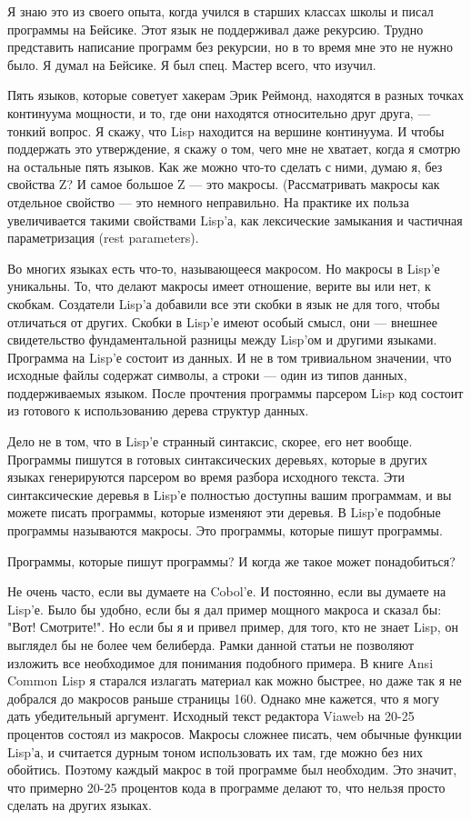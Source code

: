 \documentclass[ebook,12pt,oneside,openany]{memoir}
\begin{document}
Я знаю это из своего опыта, когда учился в старших классах школы и
писал программы на Бейсике. Этот язык не поддерживал даже рекурсию.
Трудно представить написание программ без рекурсии, но в то время мне
это не нужно было. Я думал на Бейсике. Я был спец. Мастер всего, что
изучил.

Пять языков, которые советует хакерам Эрик Реймонд, находятся в разных
точках континуума мощности, и то, где они находятся относительно друг
друга, — тонкий вопрос. Я скажу, что Lisp находится на вершине
континуума. И чтобы поддержать это утверждение, я скажу о том, чего
мне не хватает, когда я смотрю на остальные пять языков. Как же можно
что-то сделать с ними, думаю я, без свойства Z? И самое большое Z —
это макросы. (Рассматривать макросы как отдельное свойство — это
немного неправильно. На практике их польза увеличивается такими
свойствами Lisp'а, как лексические замыкания и частичная
параметризация (rest parameters).

Во многих языках есть что-то, называющееся макросом. Но макросы в
Lisp'е уникальны. То, что делают макросы имеет отношение, верите вы
или нет, к скобкам. Создатели Lisp'а добавили все эти скобки в язык не
для того, чтобы отличаться от других. Скобки в Lisp'е имеют особый
смысл, они — внешнее свидетельство фундаментальной разницы между
Lisp'ом и другими языками. Программа на Lisp'е состоит из данных. И не
в том тривиальном значении, что исходные файлы содержат символы, а
строки — один из типов данных, поддерживаемых языком. После прочтения
программы парсером Lisp код состоит из готового к использованию дерева
структур данных.

Дело не в том, что в Lisp'е странный синтаксис, скорее, его нет
вообще. Программы пишутся в готовых синтаксических деревьях, которые в
других языках генерируются парсером во время разбора исходного текста.
Эти синтаксические деревья в Lisp'е полностью доступны вашим
программам, и вы можете писать программы, которые изменяют эти
деревья. В Lisp'е подобные программы называются макросы. Это
программы, которые пишут программы.

Программы, которые пишут программы? И когда же такое может
понадобиться?

Не очень часто, если вы думаете на Cobol'е. И постоянно, если вы
думаете на Lisp'е. Было бы удобно, если бы я дал пример мощного
макроса и сказал бы: "Вот! Смотрите!". Но если бы я и привел пример,
для того, кто не знает Lisp, он выглядел бы не более чем белиберда.
Рамки данной статьи не позволяют изложить все необходимое для
понимания подобного примера. В книге Ansi Common Lisp я старался
излагать материал как можно быстрее, но даже так я не добрался до
макросов раньше страницы 160. Однако мне кажется, что я могу дать
убедительный аргумент. Исходный текст редактора Viaweb на 20-25
процентов состоял из макросов. Макросы сложнее писать, чем обычные
функции Lisp'а, и считается дурным тоном использовать их там, где
можно без них обойтись. Поэтому каждый макрос в той программе был
необходим. Это значит, что примерно 20-25 процентов кода в программе
делают то, что нельзя просто сделать на других языках.
\end{document}

